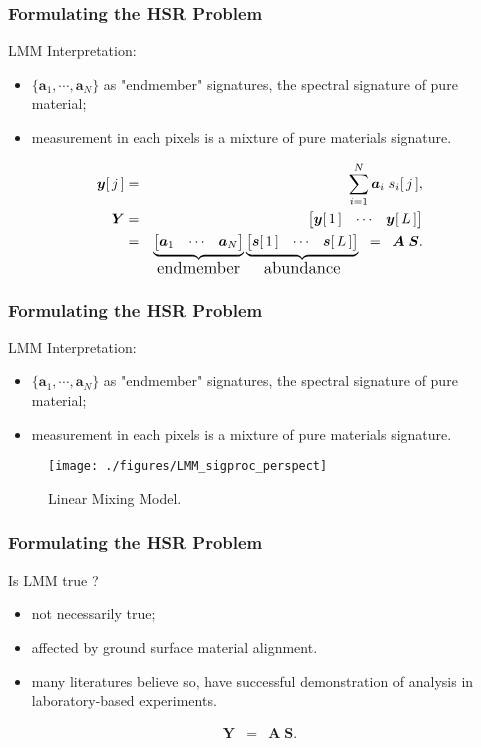 \documentclass[10pt,mathserif]{beamer}
\begin{document}
    \begin{frame}
        \frametitle{Formulating the HSR Problem}
        LMM Interpretation:
        \begin{itemize}
            \item $\{\bm a_1,\cdots,\bm a_N\}$ as "endmember" signatures,
                  the spectral signature of pure material;
            \item measurement in each pixels is a mixture of pure materials signature.
        \end{itemize}
        \begin{eqnarray*}
            \bm y[\,j\,]
            & = &
            \sum_{i=1}^N \bm a_i \; s_i[\,j\,],\\
            \bm Y
            & = &
            \begin{bmatrix} \bm y[\,1\,] & \cdots & \bm y[\,L\,] \end{bmatrix} \\
            & = &
            \underbrace{\begin{bmatrix} \bm a_1 & \cdots & \bm a_N \end{bmatrix}}_{  \text{\large endmember}}
            \underbrace{\begin{bmatrix} \bm s[\,1\,] & \cdots & \bm s[\,L\,] \end{bmatrix}}_{\text{\large abundance}}
            \;\; = \;\; \bm A \; \bm S.
        \end{eqnarray*}
    \end{frame}
    \begin{frame}
        \frametitle{Formulating the HSR Problem}
        LMM Interpretation:
        \begin{itemize}
            \item $\{\bm a_1,\cdots,\bm a_N\}$ as "endmember" signatures,
                  the spectral signature of pure material;
            \item measurement in each pixels is a mixture of pure materials signature.
        \end{itemize}
        \begin{figure}
            \texttt{[image: ./figures/LMM\_sigproc\_perspect]}
            \caption{Linear Mixing Model. \cite{SIGPROC_PERSP_ON_HU}}
        \end{figure}
    \end{frame}
    \begin{frame}
        \frametitle{Formulating the HSR Problem}
        Is LMM true ?
        \begin{itemize}
            \item not necessarily true;
            \item affected by ground surface material alignment.
            \item many literatures believe so, have successful demonstration
                  of analysis in laboratory-based experiments.
        \end{itemize}
        \begin{eqnarray*}
            \bm Y
            & = &
            \bm A \; \bm S.
        \end{eqnarray*}
    \end{frame}
\end{document}
